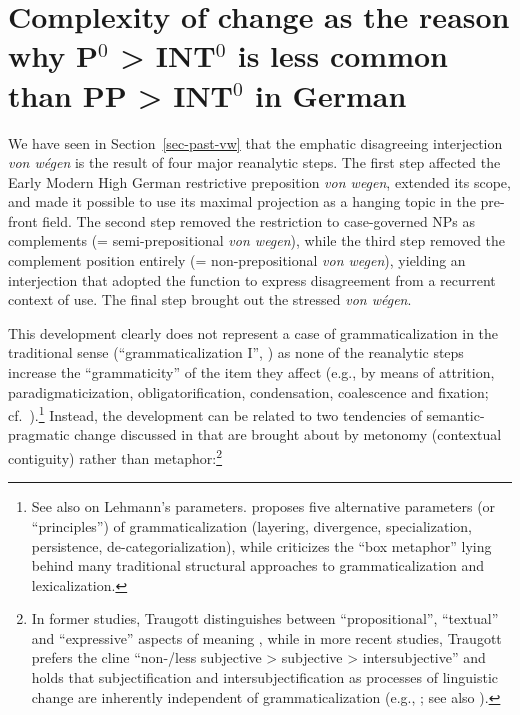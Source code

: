 \documentclass[output=paper
  ,nobabel
  ,draftmode
  ,babelshorthands
  ,colorlinks, citecolor=brown
]{langscibook}
\begin{document}
\section{Complexity of change as the reason why P$^0$ > INT$^0$ is less common than PP > INT$^0$ in German}\label{sec-complex-vw}

We have seen in Section~\ref{sec-past-vw} that the emphatic disagreeing interjection \emph{von wégen} is the result of four major reanalytic steps. The first step affected the Early Modern High German restrictive preposition \emph{von wegen}, extended its scope, and made it possible to use its maximal projection as a hanging topic in the pre-front field. The second step removed the restriction to case-governed NPs as complements (= semi-prepositional \emph{von wegen}), while the third step removed the complement position entirely (= non-prepositional \emph{von wegen}), yielding an interjection that adopted the function to express disagreement from a recurrent context of use. The final step brought out the stressed \emph{von wégen}.

This development clearly does not represent a case of grammaticalization in the traditional sense (``grammaticalization I'', \citealp{Wischer2000})
as none of the reanalytic steps increase the ``grammaticity'' of the item they affect (e.g., by means of attrition, paradigmaticization, obligatorification, condensation, coalescence and fixation; cf.\ \citealp[174]{Lehmann2015}).\footnote{See also \citet{Norde2012} on Lehmann’s parameters. \citet{Hopper1991,Hopper1996}
proposes five alternative parameters (or ``principles'') of grammaticalization (layering, divergence, specialization, persistence, de-categorialization), while \citet{Himmelmann2004}
criticizes the ``box metaphor'' lying behind many traditional structural approaches to
grammaticalization and lexicalization.}  Instead, the development can be related to two tendencies
of semantic\hyp pragmatic change discussed in \citet{TraugottKoenig1991} that are brought about by metonomy (contextual contiguity) rather than metaphor:\footnote{In former studies, Traugott distinguishes between ``propositional'', ``textual'' and ``expressive'' aspects of meaning \citep[cf.][]{Traugott1982}, while in more recent studies, Traugott prefers the cline ``non-/less subjective > subjective > intersubjective'' and holds that subjectification and intersubjectification as processes of linguistic change are inherently independent of grammaticalization (e.g., \citealp{Traugott2010}; see also \citealp[57–59]{Brinton1996}).
}
 
\end{document}
